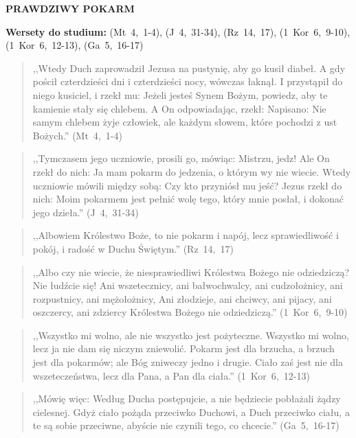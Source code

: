 \documentclass[10pt,a4paper,oneside]{article}
\begin{document}
\centerline{\textbf{\MakeUppercase{Prawdziwy pokarm}}}
\begin{center}
\textbf{Wersety do studium:} (Mt~4,~1-4), (J~4,~31-34), (Rz~14,~17), (1~Kor~6,~9-10), (1~Kor~6,~12-13), (Ga~5,~16-17)
\end{center}
\begin{quote}
,,Wtedy Duch zaprowadził Jezusa na pustynię, aby go kusił diabeł. A gdy pościł czterdzieści dni i czterdzieści nocy, wówczas łaknął. I przystąpił do niego kusiciel, i rzekł mu: Jeżeli jesteś Synem Bożym, powiedz, aby te kamienie stały się chlebem. A On odpowiadając, rzekł: Napisano: Nie samym chlebem żyje człowiek, ale każdym słowem, które pochodzi z ust Bożych.'' (Mt~4,~1-4)
\end{quote}
\begin{quote}
,,Tymczasem jego uczniowie, prosili go, mówiąc: Mistrzu, jedz! Ale On rzekł do nich: Ja mam pokarm do jedzenia, o którym wy nie wiecie. Wtedy uczniowie mówili między sobą: Czy kto przyniósł mu jeść? Jezus rzekł do nich: Moim pokarmem jest pełnić wolę tego, który mnie posłał, i dokonać jego dzieła.'' (J~4,~31-34)
\end{quote}
\begin{quote}
,,Albowiem Królestwo Boże, to nie pokarm i napój, lecz sprawiedliwość i pokój, i radość w Duchu Świętym.'' (Rz~14,~17)
\end{quote}
\begin{quote}
,,Albo czy nie wiecie, że niesprawiedliwi Królestwa Bożego nie odziedziczą? Nie łudźcie się! Ani wszetecznicy, ani bałwochwalcy, ani cudzołożnicy, ani rozpustnicy, ani mężołożnicy, Ani złodzieje, ani chciwcy, ani pijacy, ani oszczercy, ani zdziercy Królestwa Bożego nie odziedziczą.'' (1~Kor~6,~9-10)
\end{quote}
\begin{quote}
,,Wszystko mi wolno, ale nie wszystko jest pożyteczne. Wszystko mi wolno, lecz ja nie dam się niczym zniewolić. Pokarm jest dla brzucha, a brzuch jest dla pokarmów; ale Bóg zniweczy jedno i drugie. Ciało zaś jest nie dla wszeteczeństwa, lecz dla Pana, a Pan dla ciała.'' (1~Kor~6,~12-13)
\end{quote}
\begin{quote}
,,Mówię więc: Według Ducha postępujcie, a nie będziecie pobłażali żądzy cielesnej. Gdyż ciało pożąda przeciwko Duchowi, a Duch przeciwko ciału, a te są sobie przeciwne, abyście nie czynili tego, co chcecie.'' (Ga~5,~16-17)
\end{quote}
\end{document}
